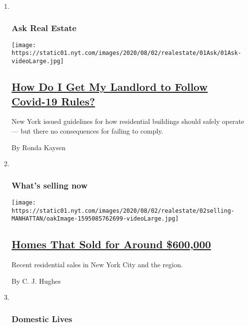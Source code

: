\begin{enumerate}
\def\labelenumi{\arabic{enumi}.}
\item ~
  \hypertarget{ask-real-estate}{%
  \subsubsection{Ask Real Estate}\label{ask-real-estate}}

  \texttt{[image: https://static01.nyt.com/images/2020/08/02/realestate/01Ask/01Ask-videoLarge.jpg]}

  \hypertarget{how-do-i-get-my-landlord-to-follow-covid-19-rules}{%
  \subsection{\texorpdfstring{\href{/2020/08/01/realestate/coronavirus-covid-apartment-buildings.html}{How
  Do I Get My Landlord to Follow Covid-19
  Rules?}}{How Do I Get My Landlord to Follow Covid-19 Rules?}}\label{how-do-i-get-my-landlord-to-follow-covid-19-rules}}

  New York issued guidelines for how residential buildings should safely
  operate --- but there no consequences for failing to comply.

  By Ronda Kaysen
\item ~
  \hypertarget{whats-selling-now}{%
  \subsubsection{What's selling now}\label{whats-selling-now}}

  \texttt{[image: https://static01.nyt.com/images/2020/08/02/realestate/02selling-MANHATTAN/oakImage-1595085762699-videoLarge.jpg]}

  \hypertarget{homes-that-sold-for-around-600000}{%
  \subsection{\texorpdfstring{\href{/2020/08/02/realestate/homes-that-sold-for-around-600000.html}{Homes
  That Sold for Around
  \$600,000}}{Homes That Sold for Around \$600,000}}\label{homes-that-sold-for-around-600000}}

  Recent residential sales in New York City and the region.

  By C. J. Hughes
\item ~
  \hypertarget{domestic-lives}{%
  \subsubsection{Domestic Lives}\label{domestic-lives}}


\end{enumerate}
